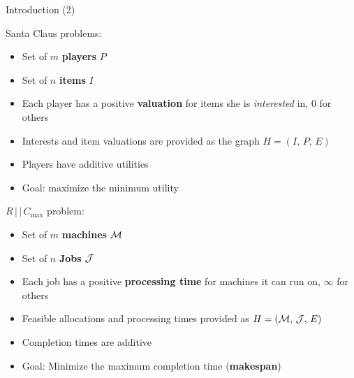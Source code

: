 \begin{frame}[t]{Introduction (2)}
    \begin{minipage}[t]{0.48\textwidth}
        Santa Claus problems:
        \begin{itemize}
            \item<2-> Set of $m$ \textbf{players} $P$
            \item<3-> Set of $n$ \textbf{items} $I$
            \item<4-> Each player has a positive \textbf{valuation} for items she is \emph{interested} in, 0 for others
            \item<5-> Interests and item valuations are provided as the graph $H = (I, \, P, \, E)$
            \item<6-> Players have additive utilities
            \item<7-> Goal: maximize the minimum utility
        \end{itemize}
    \end{minipage}    
    \begin{minipage}[t]{0.48\textwidth}
        $R \, | \, | \, C_{\max}$ problem:
        \begin{itemize}
            \item<8-> Set of $m$ \textbf{machines} $\mathcal{M}$
            \item<9-> Set of $n$ \textbf{Jobs} $\mathcal{J}$
            \item<10-> Each job has a positive \textbf{processing time} for machines it can run on, $\infty$ for others
            \item<11-> Feasible allocations and processing times provided as $H = (\mathcal{M}, \, \mathcal{J}, \, E)$
            \item<13-> Completion times are additive
            \item<14-> Goal: Minimize the maximum completion time (\textbf{makespan})
        \end{itemize}
    \end{minipage}
\end{frame}

